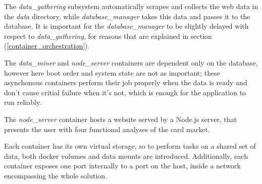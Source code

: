 The \textit{data\_gathering} subsystem automatically scrapes and collects the web data in the \textit{data} directory, while \textit{database\_manager} takes this data and passes it to the database. It is important for the \textit{database\_manager} to be slightly delayed with respect to \textit{data\_gathering}, for reasons that are explained in section (\ref{container_orchestration}).

The \textit{data\_miner} and \textit{node\_server} containers are dependent only on the database, however here boot order and system state are not as important; these asynchonous containers perform their job properly when the data is ready and don't cause critial failure when it's not, which is enough for the application to run reliably.

The \textit{node\_server} container hosts a website served by a Node.js server, that presents the user with four functional analyses of the card market.

Each container has its own virtual storage, so to perform tasks on a shared set of data, both docker volumes and data mounts are introduced. Additionally, each container exposes one port internally to a port on the host, inside a network encompassing the whole solution.
